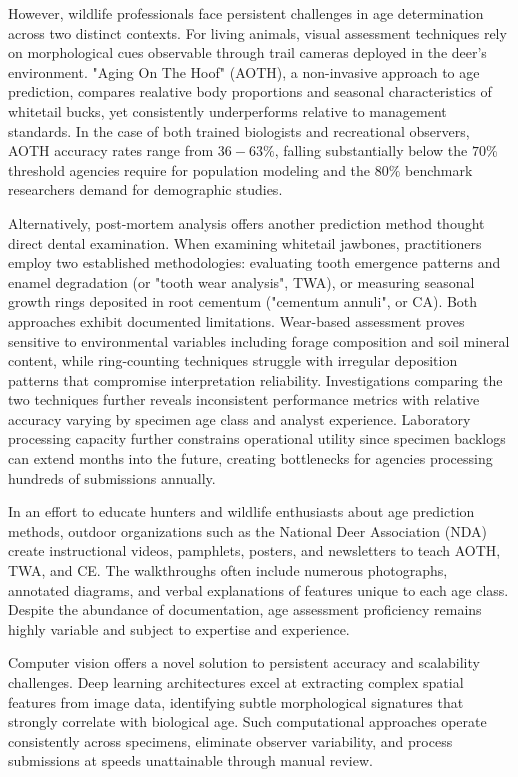 \documentclass{iopjournal}
\begin{document}
However, wildlife professionals face persistent challenges in age determination across two distinct contexts. For living animals, visual assessment techniques rely on morphological cues observable through trail cameras deployed in the deer's environment. "Aging On The Hoof" (AOTH), a non-invasive approach to age prediction, compares realative body proportions and seasonal characteristics of whitetail bucks, yet consistently underperforms relative to management standards. In the case of both trained biologists and recreational observers, AOTH accuracy rates range from $36-63\%$, falling substantially below the $70\%$ threshold agencies require for population modeling and the $80\%$ benchmark researchers demand for demographic studies.

Alternatively, post-mortem analysis offers another prediction method thought direct dental examination. When examining whitetail jawbones, practitioners employ two established methodologies: evaluating tooth emergence patterns and enamel degradation (or "tooth wear analysis", TWA), or measuring seasonal growth rings deposited in root cementum ("cementum annuli", or CA). Both approaches exhibit documented limitations. Wear-based assessment proves sensitive to environmental variables including forage composition and soil mineral content, while ring-counting techniques struggle with irregular deposition patterns that compromise interpretation reliability. Investigations comparing the two techniques further reveals inconsistent performance metrics with relative accuracy varying by specimen age class and analyst experience. Laboratory processing capacity further constrains operational utility since specimen backlogs can extend months into the future, creating bottlenecks for agencies processing hundreds of submissions annually.

In an effort to educate hunters and wildlife enthusiasts about age prediction methods, outdoor organizations such as the National Deer Association (NDA) create  instructional videos, pamphlets, posters, and newsletters to teach AOTH, TWA, and CE. The walkthroughs often include numerous photographs, annotated diagrams, and verbal explanations of features unique to each age class. Despite the abundance of documentation, age assessment proficiency remains highly variable and subject to expertise and experience.

Computer vision offers a novel solution to persistent accuracy and scalability challenges. Deep learning architectures excel at extracting complex spatial features from image data, identifying subtle morphological signatures that strongly correlate with biological age. Such computational approaches operate consistently across specimens, eliminate observer variability, and process submissions at speeds unattainable through manual review.
\end{document}
